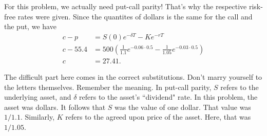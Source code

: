 \documentclass{ximera}
\begin{document}
\begin{solution}
For this problem, we actually need put-call parity! That's why the respective risk-free rates were given. Since the quantites of dollars is the same for the call and the put, we have
	\begin{align*}
	c-p&=S(0)e^{-\delta T}-Ke^{-rT}\\
	c-55.4&=500\left(\frac{1}{1.1}e^{-0.06\cdot 0.5}-\frac{1}{1.05}e^{-0.03\cdot 0.5}\right)\\
	c&=27.41.
	\end{align*}
\end{solution}

The difficult part here comes in the correct substitutions. Don't marry yourself to the letters themselves. Remember the meaning. In put-call parity, $S$ refers to the underlying asset, and $\delta$ refers to the asset's ``dividend" rate. In this problem, the asset was dollars. It follows that $S$ was the value of one dollar. That value was $1/1.1$. Similarly, $K$ refers to the agreed upon price of the asset. Here, that was $1/1.05$.
\end{document}
